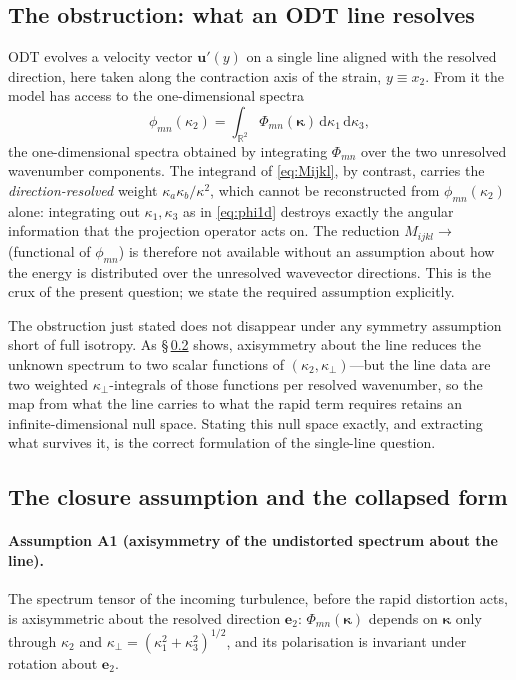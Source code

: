 \documentclass[lineno]{JFM-FLM_Au}
\newcounter{assumption}
\begin{document}
\subsection{The obstruction: what an ODT line resolves}\label{sec:obstruction}

ODT evolves a velocity vector $\boldsymbol{u}'(y)$ on a single line aligned
with the resolved direction, here taken along the contraction axis of the
strain, $y\equiv x_2$. From it the model has access to the one-dimensional
spectra
\begin{equation}
  \phi_{mn}(\kappa_2)
  = \int_{\mathbb{R}^2}
      \Phi_{mn}(\boldsymbol{\kappa})\,
      \mathrm{d}\kappa_1\,\mathrm{d}\kappa_3,
  \label{eq:phi1d}
\end{equation}
the one-dimensional spectra obtained by integrating $\Phi_{mn}$ over the two
unresolved wavenumber components. The integrand of \eqref{eq:Mijkl}, by
contrast, carries the \emph{direction-resolved} weight
$\kappa_a\kappa_b/\kappa^2$, which cannot be reconstructed from
$\phi_{mn}(\kappa_2)$ alone: integrating out $\kappa_1,\kappa_3$ as in
\eqref{eq:phi1d} destroys exactly the angular information that the projection
operator acts on. The reduction $M_{ijkl}\!\to\!$ (functional of
$\phi_{mn}$) is therefore not available without an assumption about how the
energy is distributed over the unresolved wavevector directions. This is the crux of the present question; we state the required assumption explicitly.

The obstruction just stated does not disappear under any symmetry
assumption short of full isotropy. As \S\,\ref{sec:assumption} shows,
axisymmetry about the line reduces the unknown spectrum to two scalar
functions of $(\kappa_2,\kappa_\perp)$---but the line data are two weighted
$\kappa_\perp$-integrals of those functions per resolved wavenumber, so the
map from what the line carries to what the rapid term requires retains an
infinite-dimensional null space. Stating this null space exactly, and
extracting what survives it, is the correct formulation of the single-line
question.

\subsection{The closure assumption and the collapsed form}
\label{sec:assumption}

\paragraph{Assumption A1 (axisymmetry of the undistorted spectrum about the
line).} The spectrum tensor of the incoming turbulence, before the rapid
distortion acts, is axisymmetric about the resolved direction $\boldsymbol{e}_2$:
$\Phi_{mn}(\boldsymbol{\kappa})$ depends on $\boldsymbol{\kappa}$ only through
$\kappa_2$ and $\kappa_\perp=(\kappa_1^2+\kappa_3^2)^{1/2}$, and its
polarisation is invariant under rotation about $\boldsymbol{e}_2$.
\end{document}
